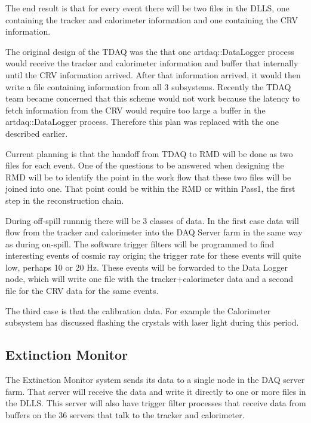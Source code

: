 The end result is that for every event there will be two files in the DLLS,
one containing the tracker and calorimeter information
and one containing the CRV information.

The original design of the TDAQ was the that one {\code artdaq::DataLogger} process
would receive the tracker and calorimeter information
and buffer that internally until the CRV information arrived.
After that information arrived, it would then write a file containing information from all 3 subsystems.
Recently the TDAQ team became concerned that this scheme would not work because
the latency to fetch information from the CRV would require too large a buffer in the
{\code artdaq::DataLogger} process.
Therefore this plan was replaced with the one described earlier.

Current planning is that the handoff from TDAQ to RMD will be done as two files
for each event.
One of the questions to be answered when designing the RMD will be to identify
the point in the work flow that these two files will be joined into one.
That point could be within the RMD or within Pass1, the first step in the
reconstruction chain.

During off-spill runnnig there will be 3 classes of data.
In the first case data will flow from the tracker and calorimeter into the
DAQ Server farm in the same way as during on-spill.
The software trigger filters will be programmed to find interesting events
of cosmic ray origin;
the trigger rate for these events will quite low, perhaps 10 or 20 Hz.
These events will be forwarded to the Data Logger node, which will
write one file with the tracker+calorimeter data and a second
file for the CRV data for the same events.


The third case is that the calibration data.  For example the Calorimeter
subsystem has discussed flashing the crystals with laser light during this period.


\subsection{Extinction Monitor}
\label{ssec:ExtMon}

The Extinction Monitor system sends its data to a single node in the DAQ server farm.
That server will receive the data and write it directly to one or more files in
the DLLS.  This server will also have trigger filter processes that receive
data from buffers on the 36 servers that talk to the tracker and calorimeter.

